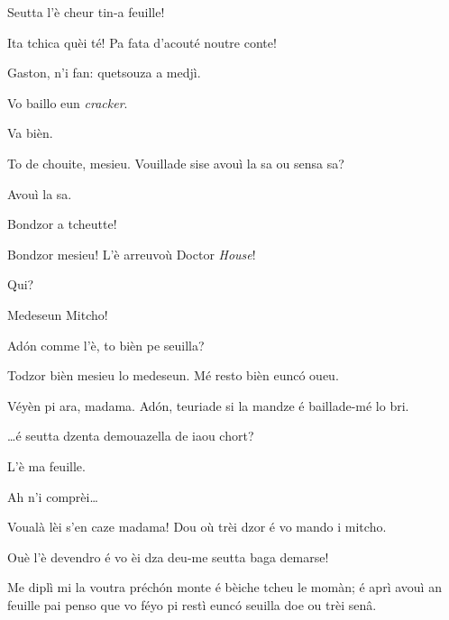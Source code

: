 \begin{drama}
\Casimirspeaks Seutta l’è cheur tin-a feuille!

\Gerominespeaks Ita tchica quèi té! Pa fata d'acouté noutre conte!

\PersEmpourtantaspeaks {} Gaston, n’i fan: quetsouza a medjì.

\Eunfeurmispeaks Vo baillo eun \textit{cracker}. 

\PersEmpourtantaspeaks Va bièn.

\Eunfeurmispeaks To de chouite, mesieu. Vouillade sise avouì la sa ou sensa sa?

\PersEmpourtantaspeaks Avouì la sa. 



\MedMitchospeaks Bondzor a tcheutte!

\Eunfeurmispeaks  Bondzor mesieu! L'è arreuvoù Doctor \textit{House}!

\Casimirspeaks Qui?

\Eunfeurmispeaks Medeseun Mitcho!

\MedMitchospeaks Ad\'on comme l'è, to bièn pe seuilla?

\Gerominespeaks Todzor bièn mesieu lo medeseun. Mé resto bièn eunc\'o oueu.

\MedMitchospeaks Véyèn pi ara, madama. Ad\'on, teuriade si la mandze é baillade-mé lo bri.


\MedMitchospeaks{} \ldots é seutta dzenta demouazella de iaou chort?

\Gerominespeaks L’è ma feuille.

\MedMitchospeaks Ah n’i comprèi\ldots


\MedMitchospeaks Voualà lèi s’en caze madama! Dou où trèi dzor é vo mando i mitcho.

\Gerominespeaks Ouè l’è devendro é vo èi dza deu-me seutta baga demarse!

\MedMitchospeaks Me diplì mi la voutra préch\'on monte é bèiche tcheu le momàn; é aprì avouì an feuille pai penso que vo féyo pi restì eunc\'o seuilla doe ou trèi senâ.


\end{drama}
